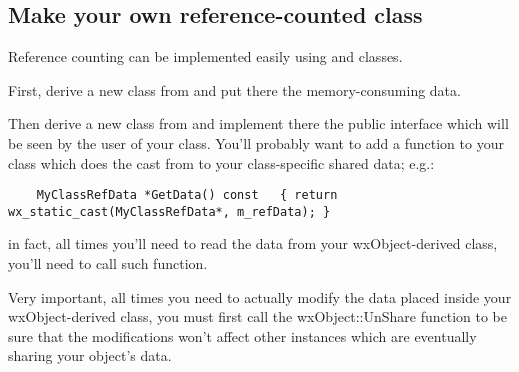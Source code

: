 \subsection{Make your own reference-counted class}\label{wxobjectoverview}

Reference counting can be implemented easily using 
and  classes.

First, derive a new class from  and
put there the memory-consuming data.

Then derive a new class from  and implement there
the public interface which will be seen by the user of your class.
You'll probably want to add a function to your class which does the cast from
 to your class-specific shared data; e.g.:

\begin{verbatim}
    MyClassRefData *GetData() const   { return wx_static_cast(MyClassRefData*, m_refData); }
\end{verbatim}

in fact, all times you'll need to read the data from your wxObject-derived class,
you'll need to call such function.

Very important, all times you need to actually modify the data placed inside your
wxObject-derived class, you must first call the wxObject::UnShare
function to be sure that the modifications won't affect other instances which are
eventually sharing your object's data.

